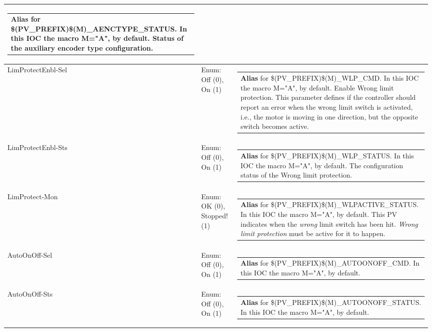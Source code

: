 \documentclass[openany]{article}
\begin{document}
\begin{longtable}{| m{4.5cm} m{2.5cm}  m{8.5cm} |}
\begin{tabular}{@{}m{6cm}@{}}
                \textbf{\color{blue} Alias} for \$(PV\_PREFIX)\$(M)\_AENCTYPE\_STATUS. In this IOC the macro M="A", by default. Status of the auxiliary encoder type configuration.
            \end{tabular} \hypertarget{pv:lim-protect-enbl}{}\\ \hline
        LimProtectEnbl-Sel & Enum: Off (0), On (1) & \begin{tabular}{@{}m{6cm}@{}}
                \textbf{\color{blue} Alias} for \$(PV\_PREFIX)\$(M)\_WLP\_CMD. In this IOC the macro M="A", by default. Enable Wrong limit protection. This parameter defines if the controller should report an error when the wrong limit switch is activated, i.e., the motor is moving in one direction, but the opposite switch becomes active.
            \end{tabular} \hypertarget{}{}\\ \hline
        LimProtectEnbl-Sts & Enum: Off (0), On (1) & \begin{tabular}{@{}m{6cm}@{}}
                \textbf{\color{blue} Alias} for \$(PV\_PREFIX)\$(M)\_WLP\_STATUS. In this IOC the macro M="A", by default. The configuration status of the Wrong limit protection.
            \end{tabular} \hypertarget{pv:lim-protect-mon}{}\\ \hline
        LimProtect-Mon & Enum: OK (0), Stopped! (1) & \begin{tabular}{@{}m{6cm}@{}}
                \textbf{\color{blue} Alias} for \$(PV\_PREFIX)\$(M)\_WLPACTIVE\_STATUS. In this IOC the macro M="A", by default. This PV indicates when the \emph{wrong} limit switch has been hit. \emph{Wrong limit protection} must be active for it to happen.
            \end{tabular} \hypertarget{pv:auto-on-off}{}\\ \hline
        AutoOnOff-Sel & Enum: Off (0), On (1) & \begin{tabular}{@{}m{6cm}@{}}
                \textbf{\color{blue} Alias} for \$(PV\_PREFIX)\$(M)\_AUTOONOFF\_CMD. In this IOC the macro M="A", by default.
            \end{tabular} \hypertarget{}{}\\ \hline
        AutoOnOff-Sts & Enum: Off (0), On (1) & \begin{tabular}{@{}m{6cm}@{}}
                \textbf{\color{blue} Alias} for \$(PV\_PREFIX)\$(M)\_AUTOONOFF\_STATUS. In this IOC the macro M="A", by default.

\end{tabular}
\end{longtable}
\end{document}
